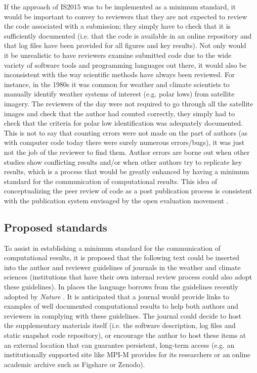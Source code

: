 If the approach of IS2015 was to be implemented as a minimum standard, it would be important to convey to reviewers that they are not expected to review the code associated with a submission; they simply have to check that it is sufficiently documented (i.e. that the code is available in an online repository and that log files have been provided for all figures and key results). Not only would it be unrealistic to have reviewers examine submitted code due to the wide variety of software tools and programming languages out there, it would also be inconsistent with the way scientific methods have always been reviewed. For instance, in the 1980s it was common for weather and climate scientists to manually identify weather systems of interest (e.g. polar lows) from satellite imagery. The reviewers of the day were not required to go through all the satellite images and check that the author had counted correctly, they simply had to check that the criteria for polar low identification was adequately documented. This is not to say that counting errors were not made on the part of authors (as with computer code today there were surely numerous errors/bugs), it was just not the job of the reviewer to find them. Author errors are borne out when other studies show conflicting results and/or when other authors try to replicate key results, which is a process that would be greatly enhanced by having a minimum standard for the communication of computational results. This idea of conceptualizing the peer review of code as a post publication process is consistent with the publication system envisaged by the open evaluation movement \citep[e.g.][]{Kriegeskorte2012}. 
  
\subsection{Proposed standards}

To assist in establishing a minimum standard for the communication of computational results, it is proposed that the following text could be inserted into the author and reviewer guidelines of journals in the weather and climate sciences (institutions that have their own internal review process could also adopt these guidelines). In places the language borrows from the guidelines recently adopted by \textit{Nature} \citep{Nature2014}. It is anticipated that a journal would provide links to examples of well documented computational results to help both authors and reviewers in complying with these guidelines. The journal could decide to host the supplementary materials itself (i.e. the software description, log files and static snapshot code repository), or encourage the author to host these items at an external location that can guarantee persistent, long-term access (e.g. an institutionally supported site like MPI-M provides for its researchers or an online academic archive such as Figshare or Zenodo).


